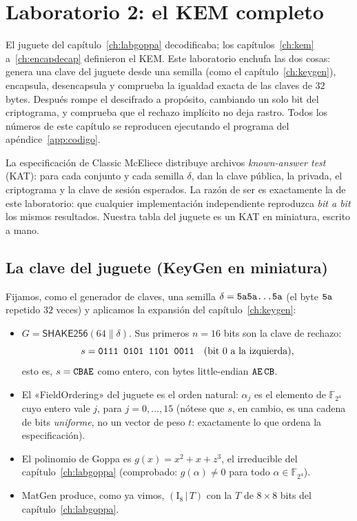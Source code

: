 \documentclass[11pt,a4paper,oneside]{report}
\newcommand{\F}{\mathbb{F}}
\newcommand{\FF}[1]{\F_{2^{#1}}}
\newcommand{\hx}[1]{\text{\texttt{#1}}}
\begin{document}
\chapter{Laboratorio 2: el KEM completo}\label{ch:labkem}

\begin{roadmap}
El juguete del capítulo~\ref{ch:labgoppa} decodificaba; los
capítulos~\ref{ch:kem} a~\ref{ch:encapdecap} definieron el KEM. Este
laboratorio enchufa las dos cosas: genera una clave del juguete desde
una semilla (como el capítulo~\ref{ch:keygen}), encapsula, desencapsula
y comprueba la igualdad exacta de las claves de $32$ bytes. Después
rompe el descifrado a propósito, cambiando un solo bit del criptograma,
y comprueba que el rechazo implícito no deja rastro. Todos los números
de este capítulo se reproducen ejecutando el programa del
apéndice~\ref{app:codigo}.
\end{roadmap}

\begin{practica}
La especificación de Classic McEliece distribuye archivos
\emph{known-answer test} (KAT): para cada conjunto y cada semilla
$\delta$, dan la clave pública, la privada, el criptograma y la clave
de sesión esperados. La razón de ser es exactamente la de este
laboratorio: que cualquier implementación independiente reproduzca
\emph{bit a bit} los mismos resultados. Nuestra tabla del juguete es un
KAT en miniatura, escrito a mano.
\end{practica}

\section{La clave del juguete (KeyGen en miniatura)}

Fijamos, como el generador de claves, una semilla
$\delta=\hx{5a5a...5a}$ (el byte $\hx{5a}$ repetido $32$ veces) y
aplicamos la expansión del capítulo~\ref{ch:keygen}:

\begin{itemize}[leftmargin=1.5em,itemsep=2pt]
  \item $G=\textsf{SHAKE256}(64\|\delta)$. Sus primeros $n=16$ bits son
        la clave de rechazo:
        \[
          s=\hx{0111 0101 1101 0011}\quad(\text{bit }0\text{ a la izquierda}),
        \]
        esto es, $s=\hx{CBAE}$ como entero, con bytes
        little-endian $\hx{AE\,CB}$.
  \item El «\textsf{FieldOrdering}» del juguete es el orden natural:
        $\alpha_j$ es el elemento de $\FF4$ cuyo entero vale $j$, para
        $j=0,\dots,15$ (nótese que $s$, en cambio, es una cadena de
        bits \emph{uniforme}, no un vector de peso $t$: exactamente lo
        que ordena la especificación).
  \item El polinomio de Goppa es $g(x)=x^2+x+z^3$, el irreducible del
        capítulo~\ref{ch:labgoppa} (comprobado: $g(\alpha)\ne0$ para
        todo $\alpha\in\FF4$).
  \item \textsf{MatGen} produce, como ya vimos,
        $(\mathrm{I}_8\,|\,T)$ con la $T$ de $8\times8$ bits del
        capítulo~\ref{ch:labgoppa}.
\end{itemize}
\end{document}
